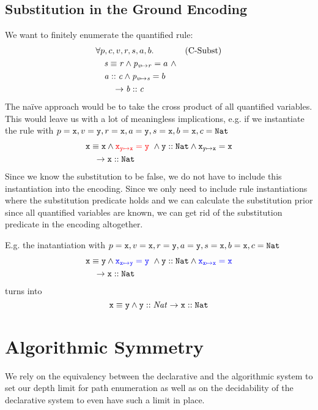 \documentclass[a4paper]{article}
\begin{document}
\newpage
\subsection{Substitution in the Ground Encoding}
We want to finitely enumerate the quantified rule:
\begin{align*}
  &\forall p, c, v, r, s, a, b. && \text{(C-Subst)}\\
  &\quad \mathit{s} \equiv \mathit{r} \land \mathit{p}_{\mathit{v} \mapsto \mathit{r}}=a~\land\\
  &\quad \mathit{a} :: \mathit{c} \land
         \mathit{p}_{\mathit{v} \mapsto \mathit{s}}=b\\
  &\qquad \rightarrow \mathit{b} :: \mathit{c}
\end{align*}
The na\"ive approach would be to take the cross product of all quantified variables.
This would leave us with a lot of meaningless implications,
e.g. if we instantiate the rule with
$p=\mathtt{x}, v=\mathtt{y}, r=\mathtt{x}, a=\mathtt{y}, s=\mathtt{x}, b=\mathtt{x}, c=\mathtt{Nat}$
\begin{align*}
  &\mathit{\mathtt{x}} \equiv \mathit{\mathtt{x}} \land {\color{red}\ensuremath{\mathit{\mathtt{x}}_{\mathit{\mathtt{y}} \mapsto \mathit{\mathtt{x}}}}=\mathtt{y}}~\land
  \mathit{\mathtt{y}} :: \mathit{\mathtt{Nat}} \land \mathit{\mathtt{x}}_{\mathit{\mathtt{y}} \mapsto \mathit{\mathtt{x}}}=\mathtt{x}\\
  &\quad \rightarrow \mathit{\mathtt{x}} :: \mathit{\mathtt{Nat}}
\end{align*}
Since we know the substitution to be false,
we do not have to include this instantiation into the encoding.
Since we only need to include rule instantiations where the substitution
predicate holds and we can calculate the substitution prior
since all quantified variables are known,
we can get rid of the substitution predicate in the encoding altogether.

E.g. the inatantiation with
$p=\mathtt{x}, v=\mathtt{x}, r=\mathtt{y}, a=\mathtt{y}, s=\mathtt{x}, b=\mathtt{x}, c=\mathtt{Nat}$
\begin{align*}
  &\mathit{\mathtt{x}} \equiv \mathit{\mathtt{y}} \land
   {\color{blue}\ensuremath{\mathit{\mathtt{x}}_{\mathit{\mathtt{x}} \mapsto \mathit{\mathtt{y}}}}=\mathtt{y}}~\land
   \mathit{\mathtt{y}} :: \mathit{\mathtt{Nat}} \land
   {\color{blue}\ensuremath{\mathit{\mathtt{x}}_{\mathit{\mathtt{x}} \mapsto \mathit{\mathtt{x}}}}=\mathtt{x}}\\
  &\quad \rightarrow \mathit{\mathtt{x}} :: \mathit{\mathtt{Nat}}
\end{align*}
turns into
\[
  \mathit{\mathtt{x}} \equiv \mathit{\mathtt{y}} \land \mathit{\mathtt{y}} :: \mathit{Nat} \rightarrow \mathit{\mathtt{x}} :: \mathit{\mathtt{Nat}}
\]

\section{Algorithmic Symmetry}
\label{sec:algo-symmetry}
We rely on the equivalency between the declarative and the algorithmic system
to set our depth limit for path enumeration
as well as on the decidability of the declarative system to even have such a limit in place.
\end{document}
